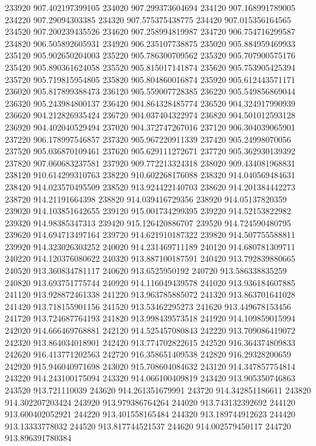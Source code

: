 {233920 907.402197399105
234020 907.299373604694
234120 907.168991789005
234220 907.29094303385
234320 907.575375438775
234420 907.015356164565
234520 907.200239435526
234620 907.258994819987
234720 906.754716299587
234820 906.505892605931
234920 906.235107738875
235020 905.884959469933
235120 905.902650204003
235220 905.786300709562
235320 905.707900575176
235420 905.890361624058
235520 905.815017141874
235620 905.753905425394
235720 905.719815954805
235820 905.804860016874
235920 905.612443571171
236020 905.817899388473
236120 905.559007728385
236220 905.549856869044
236320 905.243984800137
236420 904.864328485774
236520 904.324917990939
236620 904.212826935424
236720 904.037404322974
236820 904.501012593128
236920 904.402040529494
237020 904.372747267016
237120 906.304039065901
237220 906.178997546857
237320 905.967220911339
237420 905.24998070056
237520 905.036870109461
237620 905.629111272671
237720 905.362930139392
237820 907.060683237581
237920 909.772213324318
238020 909.434081968831
238120 910.614299310763
238220 910.602268176088
238320 914.040569484631
238420 914.023570495509
238520 913.924422140703
238620 914.201384442273
238720 914.21191664398
238820 914.039416729356
238920 914.05137820359
239020 914.103851642655
239120 915.001734299395
239220 914.52153822982
239320 914.98385347313
239420 915.126420886707
239520 914.724590480795
239620 914.694713497164
239720 914.621910187322
239820 914.507755588811
239920 914.323026303252
240020 914.231469711189
240120 914.680781309711
240220 914.120376080622
240320 913.887100187591
240420 913.792839880665
240520 913.360834781117
240620 913.6525950192
240720 913.586338835259
240820 913.693751775744
240920 914.116049439578
241020 913.936184607885
241120 913.928872461338
241220 913.963785885072
241320 913.863701641028
241420 913.718155901156
241520 913.53462295273
241620 913.449678153456
241720 913.724687764193
241820 913.998439573518
241920 914.109859015994
242020 914.666469768881
242120 914.525457080843
242220 913.709086419072
242320 913.864034018901
242420 913.774702822615
242520 916.364374809833
242620 916.413771202563
242720 916.358651409538
242820 916.29328200659
242920 915.946040971698
243020 915.708604084632
243120 914.347857754814
243220 914.243100175094
243320 914.066100409819
243420 913.905350746863
243520 913.721110039
243620 914.261351679991
243720 914.342851186611
243820 914.302207203424
243920 913.979386764264
244020 913.743132392692
244120 913.600402052921
244220 913.401558165484
244320 913.189744912623
244420 913.13333778032
244520 913.817744521537
244620 914.002579450117
244720 913.896391780384
}
